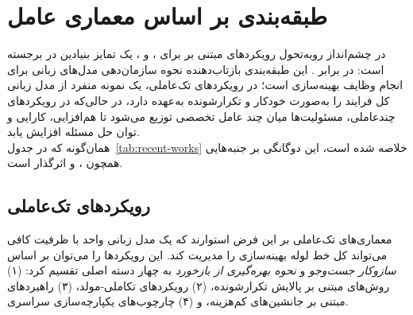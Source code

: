 \section{طبقه‌بندی بر اساس معماری عامل}
در چشم‌انداز رو‌به‌تحول رویکردهای مبتنی بر  برای ،  و ، یک تمایز بنیادین در  برجسته است:  در برابر . این طبقه‌بندی بازتاب‌دهنده نحوه سازمان‌دهی مدل‌های زبانی برای انجام وظایف بهینه‌سازی است؛ در رویکردهای تک‌عاملی، یک نمونه منفرد از مدل زبانی کل فرایند را به‌صورت خودکار و تکرارشونده به‌عهده دارد، در حالی‌که در رویکردهای چندعاملی، مسئولیت‌ها میان چند عامل تخصصی توزیع می‌شود تا هم‌افزایی، کارایی و توان حل مسئله افزایش یابد.\\ همان‌گونه که در جدول~\ref{tab:recent-works} خلاصه شده است، این دوگانگی بر جنبه‌هایی همچون ،  و  اثرگذار است.

\subsection{رویکردهای تک‌عاملی}
معماری‌های تک‌عاملی بر این فرض استوارند که یک مدل زبانی واحد با ظرفیت کافی می‌تواند کل خط لوله بهینه‌سازی را مدیریت کند. این رویکردها را می‌توان بر اساس \emph{سازوکار جست‌وجو} و \emph{نحوه بهره‌گیری از بازخورد} به چهار دسته اصلی تقسیم کرد: (۱) روش‌های مبتنی بر پالایش تکرارشونده، (۲) رویکردهای تکاملی-مولد، (۳) راهبردهای مبتنی بر جانشین‌های کم‌هزینه، و (۴) چارچوب‌های یکپارچه‌سازی سراسری.

